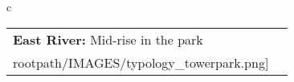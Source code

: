 \begin{table}[H]
        \begin{tabular}{c}
        \begin{tabular}{m{1.5in} m{2in}}
\textbf{East River:} {Mid-rise in the park} & \texttt{[image: \\rootpath/IMAGES/typology\_towerpark.png]}
\end{tabular}\end{tabular}
        \end{table}